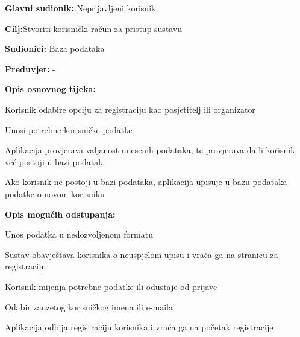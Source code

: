 				\noindent {}
				\begin{packed_item}
					
					\item \textbf{Glavni sudionik: } Neprijavljeni korisnik
					\item  \textbf{Cilj:}Stvoriti korisnički račun za pristup sustavu
					\item  \textbf{Sudionici:} Baza podataka
					\item  \textbf{Preduvjet:} -
					\item  \textbf{Opis osnovnog tijeka:}
					
					\item[] \begin{packed_enum}
						
						\item Korisnik odabire opciju za registraciju kao posjetitelj ili organizator
						\item Unosi potrebne korisničke podatke
						\item Aplikacija provjerava valjanost unesenih podataka, te provjerava da li korisnik već postoji u bazi podatak
						\item Ako korisnik ne postoji u bazi podataka, aplikacija upisuje u bazu podataka podatke o novom korisniku
					\end{packed_enum}
					
					\item  \textbf{Opis mogućih odstupanja:}
					
					\item[] \begin{packed_item}
						
						\item[3.a] Unos podatka u nedozvoljenom formatu 
						\item[] \begin{packed_enum}
							
							\item Sustav obavještava korisnika o neuspjelom upisu i vraća ga na stranicu za registraciju
							\item Korisnik mijenja potrebne podatke ili odustaje od prijave
							
						\end{packed_enum}
						
						\item[3.b] Odabir zauzetog korisničkog imena ili e-maila
						\item[] \begin{packed_enum}
							
							\item Aplikacija odbija registraciju korisnika i vraća ga na početak registracije
							
						\end{packed_enum}
						
					\end{packed_item}
				\end{packed_item}	
				
